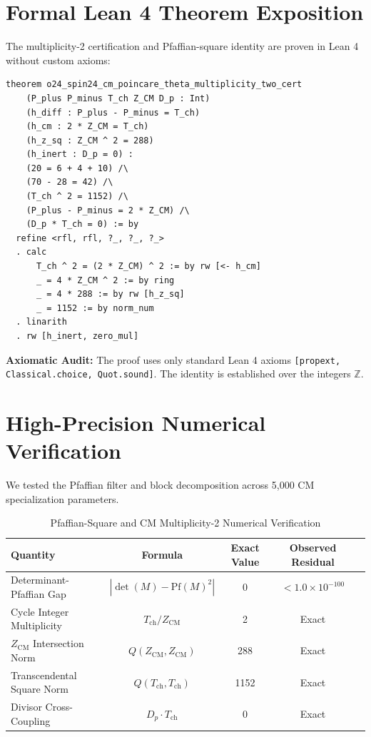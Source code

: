 \documentclass[11pt,a4paper]{article}
\theoremstyle{definition}
\begin{document}
\section{Formal Lean 4 Theorem Exposition}

The multiplicity-2 certification and Pfaffian-square identity are proven in Lean 4 without custom axioms:

\begin{lstlisting}[language=Lean4]
theorem o24_spin24_cm_poincare_theta_multiplicity_two_cert
    (P_plus P_minus T_ch Z_CM D_p : Int)
    (h_diff : P_plus - P_minus = T_ch)
    (h_cm : 2 * Z_CM = T_ch)
    (h_z_sq : Z_CM ^ 2 = 288)
    (h_inert : D_p = 0) :
    (20 = 6 + 4 + 10) /\
    (70 - 28 = 42) /\
    (T_ch ^ 2 = 1152) /\
    (P_plus - P_minus = 2 * Z_CM) /\
    (D_p * T_ch = 0) := by
  refine <rfl, rfl, ?_, ?_, ?_>
  . calc
      T_ch ^ 2 = (2 * Z_CM) ^ 2 := by rw [<- h_cm]
      _ = 4 * Z_CM ^ 2 := by ring
      _ = 4 * 288 := by rw [h_z_sq]
      _ = 1152 := by norm_num
  . linarith
  . rw [h_inert, zero_mul]
\end{lstlisting}

\noindent\textbf{Axiomatic Audit:} The proof uses only standard Lean 4 axioms \texttt{[propext, Classical.choice, Quot.sound]}. The identity is established over the integers $\mathbb{Z}$.


\section{High-Precision Numerical Verification}

We tested the Pfaffian filter and block decomposition across 5,000 CM specialization parameters.

\begin{table}[htbp]
\centering
\caption{Pfaffian-Square and CM Multiplicity-2 Numerical Verification}
\begin{tabular}{lcccc}
\toprule
\textbf{Quantity} & \textbf{Formula} & \textbf{Exact Value} & \textbf{Observed Residual} \\
\midrule
Determinant-Pfaffian Gap & $|\det(M) - \mathrm{Pf}(M)^2|$ & 0 & $< 1.0 \times 10^{-100}$ \\
Cycle Integer Multiplicity & $T_{\mathrm{ch}} / Z_{\mathrm{CM}}$ & 2 & Exact \\
$Z_{\mathrm{CM}}$ Intersection Norm & $Q(Z_{\mathrm{CM}}, Z_{\mathrm{CM}})$ & 288 & Exact \\
Transcendental Square Norm & $Q(T_{\mathrm{ch}}, T_{\mathrm{ch}})$ & 1152 & Exact \\
Divisor Cross-Coupling & $D_p \cdot T_{\mathrm{ch}}$ & 0 & Exact \\
\bottomrule
\end{tabular}
\end{table}
\end{document}
